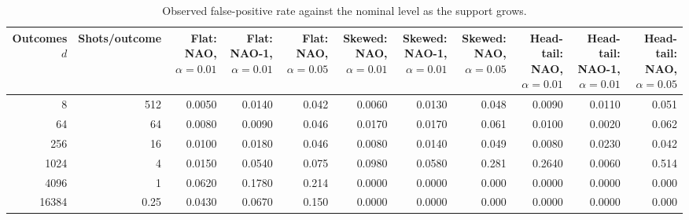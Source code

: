 \begin{table}[t]
\centering
\caption{Observed false-positive rate against the nominal level as the support grows.}
\label{tab:rq1-sparsity}
\small
\begin{tabular}{rrrrrrrrrrr}
\toprule
Outcomes $d$ & Shots/outcome & Flat: NAO, $\alpha=0.01$ & Flat: NAO-1, $\alpha=0.01$ & Flat: NAO, $\alpha=0.05$ & Skewed: NAO, $\alpha=0.01$ & Skewed: NAO-1, $\alpha=0.01$ & Skewed: NAO, $\alpha=0.05$ & Head-tail: NAO, $\alpha=0.01$ & Head-tail: NAO-1, $\alpha=0.01$ & Head-tail: NAO, $\alpha=0.05$ \\
\midrule
8 & 512 & 0.0050 & 0.0140 & 0.042 & 0.0060 & 0.0130 & 0.048 & 0.0090 & 0.0110 & 0.051 \\
64 & 64 & 0.0080 & 0.0090 & 0.046 & 0.0170 & 0.0170 & 0.061 & 0.0100 & 0.0020 & 0.062 \\
256 & 16 & 0.0100 & 0.0180 & 0.046 & 0.0080 & 0.0140 & 0.049 & 0.0080 & 0.0230 & 0.042 \\
1024 & 4 & 0.0150 & 0.0540 & 0.075 & 0.0980 & 0.0580 & 0.281 & 0.2640 & 0.0060 & 0.514 \\
4096 & 1 & 0.0620 & 0.1780 & 0.214 & 0.0000 & 0.0000 & 0.000 & 0.0000 & 0.0000 & 0.000 \\
16384 & 0.25 & 0.0430 & 0.0670 & 0.150 & 0.0000 & 0.0000 & 0.000 & 0.0000 & 0.0000 & 0.000 \\
\bottomrule
\end{tabular}
\end{table}
